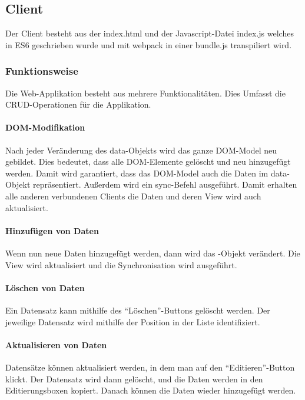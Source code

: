 \subsection{Client}
Der Client besteht aus der index.html und der Javascript-Datei index.js welches in ES6 geschrieben wurde und mit webpack in einer bundle.js transpiliert wird.

\subsubsection{Funktionsweise}

Die Web-Applikation besteht aus mehrere Funktionalitäten. Dies Umfasst die CRUD-Operationen für die Applikation.

\paragraph{DOM-Modifikation}
Nach jeder Veränderung des data-Objekts wird das ganze DOM-Model neu gebildet. Dies bedeutet, dass alle DOM-Elemente gelöscht und neu hinzugefügt werden. Damit wird garantiert, dass das DOM-Model auch die Daten im data-Objekt repräsentiert. Außerdem wird ein sync-Befehl ausgeführt. Damit erhalten alle anderen verbundenen Clients die Daten und deren View wird auch aktualisiert.

\paragraph{Hinzufügen von Daten}
Wenn nun neue Daten hinzugefügt werden, dann wird das -Objekt verändert. Die View wird aktualisiert und die Synchronisation wird ausgeführt.

\paragraph{Löschen von Daten}
Ein Datensatz kann mithilfe des ``Löschen''-Buttons gelöscht werden. Der jeweilige Datensatz wird mithilfe der Position in der Liste identifiziert.

\paragraph{Aktualisieren von Daten}
Datensätze können aktualisiert werden, in dem man auf den ``Editieren''-Button klickt. Der Datensatz wird dann gelöscht, und die Daten werden in den Editierungsboxen kopiert. Danach können die Daten wieder hinzugefügt werden. 


